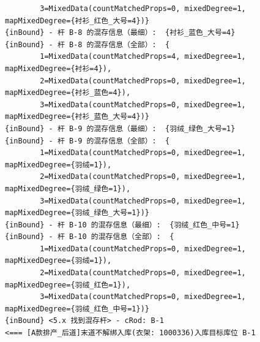 {\begin{verbatim}
		3=MixedData(countMatchedProps=0, mixedDegree=1, mapMixedDegree={衬衫_红色_大号=4})}
{inBound} - 杆 B-8 的混存信息（最细）:  {衬衫_蓝色_大号=4}
{inBound} - 杆 B-8 的混存信息（全部）:  {
		1=MixedData(countMatchedProps=4, mixedDegree=1, mapMixedDegree={衬衫=4}), 
		2=MixedData(countMatchedProps=0, mixedDegree=1, mapMixedDegree={衬衫_蓝色=4}), 
		3=MixedData(countMatchedProps=0, mixedDegree=1, mapMixedDegree={衬衫_蓝色_大号=4})}
{inBound} - 杆 B-9 的混存信息（最细）:  {羽绒_绿色_大号=1}
{inBound} - 杆 B-9 的混存信息（全部）:  {
		1=MixedData(countMatchedProps=0, mixedDegree=1, mapMixedDegree={羽绒=1}), 
		2=MixedData(countMatchedProps=0, mixedDegree=1, mapMixedDegree={羽绒_绿色=1}), 
		3=MixedData(countMatchedProps=0, mixedDegree=1, mapMixedDegree={羽绒_绿色_大号=1})}
{inBound} - 杆 B-10 的混存信息（最细）:  {羽绒_红色_中号=1}
{inBound} - 杆 B-10 的混存信息（全部）:  {
		1=MixedData(countMatchedProps=0, mixedDegree=1, mapMixedDegree={羽绒=1}), 
		2=MixedData(countMatchedProps=0, mixedDegree=1, mapMixedDegree={羽绒_红色=1}), 
		3=MixedData(countMatchedProps=0, mixedDegree=1, mapMixedDegree={羽绒_红色_中号=1})}
{inBound} <5.x 找到混存杆> - cRod: B-1
<=== [A款排产_后道]末道不解绑入库(衣架: 1000336)入库目标库位 B-1


\end{verbatim}}
